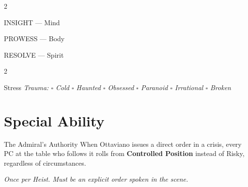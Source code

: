 \begin{multicols}{2}

\begin{attributoblock}[DoriaBlue]{INSIGHT --- Mind}
\end{attributoblock}


\begin{attributoblock}[DoriaBlue]{PROWESS --- Body}
\end{attributoblock}

\end{multicols}

\begin{attributoblock}[DoriaBlue]{RESOLVE --- Spirit}
  \begin{multicols}{2}
  \end{multicols}
\end{attributoblock}

\medskip
\begin{pgclockbox}{Stress \hfill {}}
  \small\textit{Trauma: $\square$ Cold \quad $\square$ Haunted \quad $\square$ Obsessed \quad $\square$ Paranoid \quad $\square$ Irrational \quad $\square$ Broken}
\end{pgclockbox}

\section*{Special Ability}

\begin{doriabox}{The Admiral's Authority}
  When Ottaviano issues a direct order in a crisis, every PC at the table who
  follows it rolls from \textbf{Controlled Position} instead of Risky,
  regardless of circumstances.

  \medskip\noindent\textit{Once per Heist. Must be an explicit order spoken in the scene.}
\end{doriabox}


